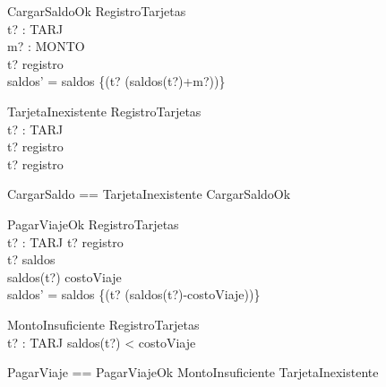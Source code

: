 \begin{schema}{CargarSaldoOk}
    \Delta RegistroTarjetas \\
    t? : TARJ \\
    m? : MONTO \\
\where
    t? \in registro \\
    saldos' = saldos \cup \{(t? \mapsto (saldos(t?)+m?))\} \\
\end{schema}

\begin{schema}{TarjetaInexistente}
    \Xi RegistroTarjetas \\
    t? : TARJ \\
\where
    t? \notin registro \\ 
    t? \notin \dom registro
\end{schema}

\begin{zed}
    CargarSaldo == TarjetaInexistente \lor CargarSaldoOk \\
\end{zed}

\begin{schema}{PagarViajeOk}
    \Delta RegistroTarjetas \\
    t? : TARJ 
\where
    t? \in registro \\
    t? \in \dom saldos \\
    saldos(t?) \geq costoViaje \\
    saldos' = saldos \cup \{(t? \mapsto (saldos(t?)-costoViaje))\} 
\end{schema}

\begin{schema}{MontoInsuficiente}
    \Xi RegistroTarjetas \\
    t? : TARJ 
\where
    saldos(t?) < costoViaje \\
\end{schema}

\begin{zed}
    PagarViaje == PagarViajeOk \lor MontoInsuficiente \lor TarjetaInexistente \\
\end{zed}
